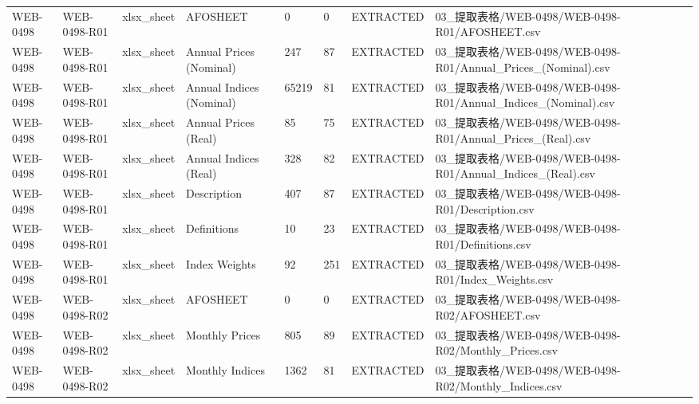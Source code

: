 \begin{landscape}
\begin{longtable}{p{1.8cm}p{2.2cm}p{3.1cm}p{4.7cm}p{1.3cm}p{1.3cm}p{3.0cm}p{5.3cm}}
WEB-0498 & WEB-0498-R01 & xlsx\_\allowbreak{}sheet & AFOSHEET & 0 & 0 & EXTRACTED & 03\_\allowbreak{}提取表格/\allowbreak{}WEB-0498/\allowbreak{}WEB-0498-R01/\allowbreak{}AFOSHEET.csv\\
WEB-0498 & WEB-0498-R01 & xlsx\_\allowbreak{}sheet & Annual Prices (Nominal) & 247 & 87 & EXTRACTED & 03\_\allowbreak{}提取表格/\allowbreak{}WEB-0498/\allowbreak{}WEB-0498-R01/\allowbreak{}Annual\_\allowbreak{}Prices\_\allowbreak{}(Nominal).csv\\
WEB-0498 & WEB-0498-R01 & xlsx\_\allowbreak{}sheet & Annual Indices (Nominal) & 65219 & 81 & EXTRACTED & 03\_\allowbreak{}提取表格/\allowbreak{}WEB-0498/\allowbreak{}WEB-0498-R01/\allowbreak{}Annual\_\allowbreak{}Indices\_\allowbreak{}(Nominal).csv\\
WEB-0498 & WEB-0498-R01 & xlsx\_\allowbreak{}sheet & Annual Prices (Real) & 85 & 75 & EXTRACTED & 03\_\allowbreak{}提取表格/\allowbreak{}WEB-0498/\allowbreak{}WEB-0498-R01/\allowbreak{}Annual\_\allowbreak{}Prices\_\allowbreak{}(Real).csv\\
WEB-0498 & WEB-0498-R01 & xlsx\_\allowbreak{}sheet & Annual Indices (Real) & 328 & 82 & EXTRACTED & 03\_\allowbreak{}提取表格/\allowbreak{}WEB-0498/\allowbreak{}WEB-0498-R01/\allowbreak{}Annual\_\allowbreak{}Indices\_\allowbreak{}(Real).csv\\
WEB-0498 & WEB-0498-R01 & xlsx\_\allowbreak{}sheet & Description & 407 & 87 & EXTRACTED & 03\_\allowbreak{}提取表格/\allowbreak{}WEB-0498/\allowbreak{}WEB-0498-R01/\allowbreak{}Description.csv\\
WEB-0498 & WEB-0498-R01 & xlsx\_\allowbreak{}sheet & Definitions & 10 & 23 & EXTRACTED & 03\_\allowbreak{}提取表格/\allowbreak{}WEB-0498/\allowbreak{}WEB-0498-R01/\allowbreak{}Definitions.csv\\
WEB-0498 & WEB-0498-R01 & xlsx\_\allowbreak{}sheet & Index Weights & 92 & 251 & EXTRACTED & 03\_\allowbreak{}提取表格/\allowbreak{}WEB-0498/\allowbreak{}WEB-0498-R01/\allowbreak{}Index\_\allowbreak{}Weights.csv\\
WEB-0498 & WEB-0498-R02 & xlsx\_\allowbreak{}sheet & AFOSHEET & 0 & 0 & EXTRACTED & 03\_\allowbreak{}提取表格/\allowbreak{}WEB-0498/\allowbreak{}WEB-0498-R02/\allowbreak{}AFOSHEET.csv\\
WEB-0498 & WEB-0498-R02 & xlsx\_\allowbreak{}sheet & Monthly Prices & 805 & 89 & EXTRACTED & 03\_\allowbreak{}提取表格/\allowbreak{}WEB-0498/\allowbreak{}WEB-0498-R02/\allowbreak{}Monthly\_\allowbreak{}Prices.csv\\
WEB-0498 & WEB-0498-R02 & xlsx\_\allowbreak{}sheet & Monthly Indices & 1362 & 81 & EXTRACTED & 03\_\allowbreak{}提取表格/\allowbreak{}WEB-0498/\allowbreak{}WEB-0498-R02/\allowbreak{}Monthly\_\allowbreak{}Indices.csv\\

\end{longtable}
\end{landscape}
